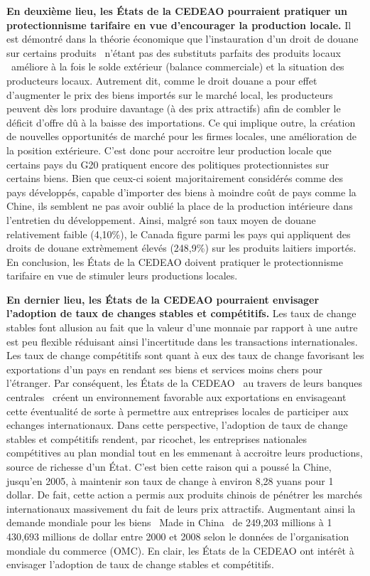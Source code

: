 	\hspace*{0.5cm}\textbf{En deuxième lieu, les \'Etats de la CEDEAO pourraient pratiquer un protectionnisme tarifaire en vue d'encourager la production locale.} Il est démontré dans la théorie économique que l'instauration d'un droit de douane sur certains produits \textendash\ n'étant pas des substituts parfaits des produits locaux \textendash\ améliore à la fois le solde extérieur (balance commerciale) et la situation des producteurs locaux. Autrement dit, comme le droit douane a pour effet d'augmenter le prix des biens importés sur le marché local, les producteurs peuvent dès lors produire davantage (à des prix attractifs) afin de combler le déficit d'offre dû à la baisse des importations. Ce qui implique outre, la création de nouvelles opportunités de marché pour les firmes locales, une amélioration de la position extérieure. C'est donc pour accroitre leur production locale que certains pays du G20 pratiquent encore des politiques protectionnistes sur certains biens. Bien que ceux-ci soient majoritairement considérés comme des pays développés, capable d'importer des biens à moindre coût de pays comme la Chine, ils semblent ne pas avoir oublié la place de la production intérieure dans l'entretien du développement. Ainsi, malgré son taux moyen de douane relativement faible (4,10\%), le Canada figure parmi les pays qui appliquent des droits de douane extrèmement élevés (248,9\%) sur les produits laitiers importés. En conclusion, les \'Etats de la CEDEAO doivent pratiquer le protectionnisme tarifaire en vue de stimuler leurs productions locales.
	
	\hspace*{0.5cm}\textbf{En dernier lieu, les \'Etats de la CEDEAO pourraient envisager l'adoption de taux de changes stables et compétitifs.} Les taux de change stables font allusion au fait que la valeur d'une monnaie par rapport à une autre est peu flexible réduisant ainsi l'incertitude dans les transactions internationales. Les taux de change compétitifs sont quant à eux des taux de change favorisant les exportations d'un pays en rendant ses biens et services moins chers pour l'étranger. Par conséquent, les \'Etats de la CEDEAO \textendash\ au travers de leurs banques centrales \textendash\ créent un environnement favorable aux exportations en envisageant cette éventualité de sorte à permettre aux entreprises locales de participer aux echanges internationaux. Dans cette perspective, l'adoption de taux de change stables et compétitifs rendent, par ricochet, les entreprises nationales compétitives au plan mondial tout en les emmenant à accroitre leurs productions, source de richesse d'un \'Etat. C'est bien cette raison qui a poussé la Chine, jusqu'en 2005, à maintenir son taux de change à environ 8,28 yuans pour 1 dollar. De fait, cette action a permis aux produits chinois de pénétrer les marchés internationaux massivement du fait de leurs prix attractifs. Augmentant ainsi la demande mondiale pour les biens \guillemetleft\ Made in China \guillemetright\ de 249,203 millions à 1 430,693 millions de dollar entre 2000 et 2008 selon le données de l'organisation mondiale du commerce (OMC). En clair, les \'Etats de la CEDEAO ont intérêt à envisager l'adoption de taux de change stables et compétitifs.\\
	
